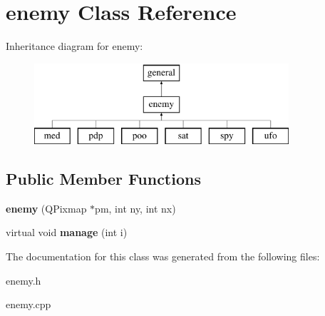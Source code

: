 \hypertarget{classenemy}{\section{enemy \-Class \-Reference}
\label{classenemy}
}
\-Inheritance diagram for enemy\-:\begin{figure}[H]
\begin{center}
\leavevmode
\includegraphics[height=3.000000cm]{classenemy}
\end{center}
\end{figure}
\subsection*{\-Public \-Member \-Functions}
\begin{DoxyCompactItemize}
\item 
\hypertarget{classenemy_ac2807eb1d070f7aa0821f58aa91c6601}{{\bfseries enemy} (\-Q\-Pixmap $\ast$pm, int ny, int nx)}\label{classenemy_ac2807eb1d070f7aa0821f58aa91c6601}

\item 
\hypertarget{classenemy_a0d29f4c2619917d29f8d7def0ef08430}{virtual void {\bfseries manage} (int i)}\label{classenemy_a0d29f4c2619917d29f8d7def0ef08430}

\end{DoxyCompactItemize}


\-The documentation for this class was generated from the following files\-:\begin{DoxyCompactItemize}
\item 
enemy.\-h\item 
enemy.\-cpp\end{DoxyCompactItemize}
